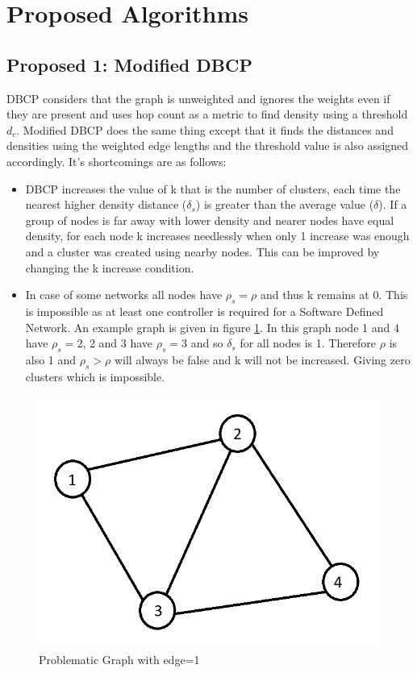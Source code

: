 \documentclass[8pt]{extarticle}
\begin{document}
	\section{Proposed Algorithms}
	\subsection{Proposed 1: Modified DBCP}
	
	DBCP considers that the graph is unweighted and ignores the weights even if they are present and uses hop count as a metric to find density using a threshold $d_c$. Modified DBCP does the same thing except that it finds the distances and densities using the weighted edge lengths and the threshold value is also assigned accordingly. It's shortcomings are as follows:
	
	\begin{itemize}
		\item DBCP increases the value of k that is the number of clusters, each time the nearest higher density distance ($\delta_s$) is greater than the average value ($\delta$). If a group of nodes is far away with lower density and nearer nodes have equal density, for each node k increases needlessly when only 1 increase was enough and a cluster was created using nearby nodes. This can be improved by changing the k increase condition.
		\item In case of some networks all nodes have $\rho_s=\rho$ and thus k remains at 0. This is impossible as at least one controller is required for a Software Defined Network. An example graph is given in figure \ref{fig:problem}. In this graph node 1 and 4 have $\rho_s=2$, 2 and 3 have $\rho_s=3$ and so $\delta_s$ for all nodes is 1. Therefore $\rho$ is also 1 and $\rho_s>\rho$ will always be false and k will not be increased. Giving zero clusters which is impossible.
	\end{itemize}

	\begin{figure}
		\includegraphics[width=\linewidth]{problem.png}
		\caption{Problematic Graph with edge=1}
		\label{fig:problem}
	\end{figure}
	
\end{document}
